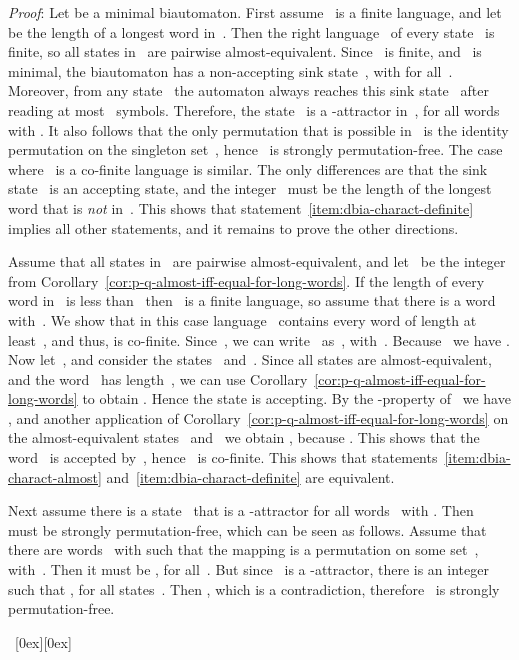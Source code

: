 \documentclass[submission]{eptcs}
\newcommand*{\qed}{\raisebox{0.5ex}[0ex][0ex]{\framebox[1ex][l]{}}}
\newenvironment{proof}{\par\noindent
  {\rmfamily\itshape\mdseries Proof\/}:\hspace{\labelsep}\ignorespaces}{\mbox{}\nolinebreak\hfill~{\qed}
  \medbreak
}
\begin{document}
\begin{proof}
  Let  be a minimal biautomaton.
  First assume~ is a finite language, and let~ be the
  length of a longest word in~.  Then the right
  language~ of every state~ is finite, so all states
  in~ are pairwise almost-equivalent.  Since~ is finite,
  and~ is minimal, the biautomaton has a non-accepting sink
  state~, with  for all~.
  Moreover, from any state~ the automaton always reaches this
  sink state~ after reading at most~ symbols.  Therefore, the
  state~ is a -attractor in~, for all
  words~ with .  It also follows that the
  only permutation that is possible in~ is the identity permutation
  on the singleton set~, hence~ is strongly
  permutation-free.  The case where~ is a co-finite language is
  similar.  The only differences are that the sink state~ is an
  accepting state, and the integer~ must be the length of the
  longest word that is \emph{not} in~.  This shows that
  statement~\ref{item:dbia-charact-definite} implies all other
  statements, and it remains to prove the other directions.

  Assume that all states in~ are pairwise almost-equivalent, and
  let~ be the integer from
  Corollary~\ref{cor:p-q-almost-iff-equal-for-long-words}.  If the
  length of every word in~ is less than~ then~ is a
  finite language, so assume that there is a word~
  with~.  We show that in this case language~
  contains every word of length at least~, and thus, is co-finite.
  Since~, we can write~ as~,
  with~.  Because~ we have .  Now let~, and consider
  the states~ and~.  Since all
  states are almost-equivalent, and the word~ has length~, we
  can use Corollary~\ref{cor:p-q-almost-iff-equal-for-long-words} to
  obtain .
  Hence the state  is accepting.
  By the -property of~ we have , and another application of
  Corollary~\ref{cor:p-q-almost-iff-equal-for-long-words} on the
  almost-equivalent states~ and~ we obtain
  , because .  This
  shows that the word~ is accepted by~, hence~ is
  co-finite.  This shows that
  statements~\ref{item:dbia-charact-almost}
  and~\ref{item:dbia-charact-definite} are equivalent.
  
  Next assume there is a state~ that is a -attractor
  for all words~ with .  Then~ must be
  strongly permutation-free, which can be seen as follows.  Assume
  that there are words~ with  such that
  the mapping  is a permutation
  on some set~, with~.  Then it must be
  , for all~. But since~
  is a -attractor, there is an integer~ such that
  , for all states~.  Then
  , which is a contradiction, therefore~ is
  strongly permutation-free.


\end{proof}
\end{document}

